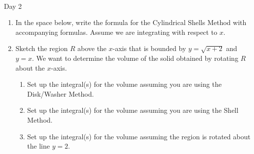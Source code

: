 \documentclass[11pt,fleqn]{article}
\begin{document}
\renewcommand{\headrulewidth}{0pt}
\newcommand{\blank}[1]{\rule{#1}{0.75pt}}
\newcommand{\bc}{\begin{center}}
\newcommand{\ec}{\end{center}}
\renewcommand{\d}{\displaystyle}

\vspace*{-0.7in}

\begin{center}
  \large
  \\
  Day 2
\end{center}

\begin{enumerate}
\item In the space below, write the formula for the Cylindrical Shells Method with accompanying formulas. Assume we are integrating with respect to $x.$\\
\vspace{1in}

\item Sketch the region $R$ above the $x$-axis that is bounded by $y=\sqrt{x+2}$ and $y=x$. We want to determine the volume of the solid obtained by rotating $R$ about the $x$-axis. \\

\vspace{1in}


\begin{enumerate}
\item Set up the integral(s) for the volume assuming you are using the Disk/Washer Method. 

\vfill
\newpage

\item Set up the integral(s) for the volume assuming you are using the Shell Method. 

\vfill

\item Set up the integral(s) for the volume assuming the region is rotated about the line $y=2.$

\vfill

\end{enumerate}
\end{enumerate}
\end{document}
